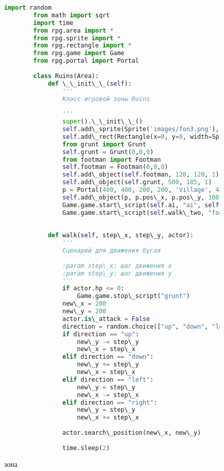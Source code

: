 \begin{figure}[H]
	\begin{lstlisting}[language=Python]
		import random
		from math import sqrt
		import time
		from rpg.area import *
		from rpg.sprite import *
		from rpg.rectangle import *
		from rpg.game import Game
		from rpg.portal import Portal
		
		class Ruins(Area):
			def \_\_init\_\_(self):
				'''
				Класс игровой зоны Ruins
		
				'''
				super().\_\_init\_\_()
				self.add\_sprite(Sprite('images/fon3.png'), 590, 400, 0)
				self.add\_rect(Rectangle(x=0, y=0, width=Sprite('images/fon3.png').image.width(),\\ height=Sprite('images/fon3.png').image.height()))
				from grunt import Grunt
				self.grunt = Grunt(0,0,0)
				from footman import Footman
				self.footman = Footman(0,0,0)
				self.add\_object(self.footman, 120, 120, 1)
				self.add\_object(self.grunt, 500, 185, 1)
				p = Portal(400, 400, 200, 200, 'Village', 480, 100)
				self.add\_object(p, p.pos\_x, p.pos\_y, 100)
				Game.game.start\_script(self.ai, "ai", self.grunt)
				Game.game.start\_script(self.walk\_two, "footman", 50, 50)
		
		
			def walk(self, step\_x, step\_y, actor):
				'''
				Сценарий для движения бугая
		
				:param step\_x: шаг движения x
				:param step\_y: шаг движения y
				'''
				if actor.hp <= 0:
					Game.game.stop\_script("grunt")
				new\_x = 200
				new\_y = 200
				actor.is\_attack = False
				direction = random.choice(["up", "down", "left", "right"])
				if direction == "up":
					new\_y -= step\_y
					new\_x = step\_x
				elif direction == "down":
					new\_y += step\_y
					new\_x = step\_x
				elif direction == "left":
					new\_y = step\_y
					new\_x -= step\_x
				elif direction == "right":
					new\_y = step\_y
					new\_x += step\_x
		
				actor.search\_position(new\_x, new\_y)
		
				time.sleep(2)
	\end{lstlisting}  
\caption{зона}
\label{area:image}
\end{figure}

